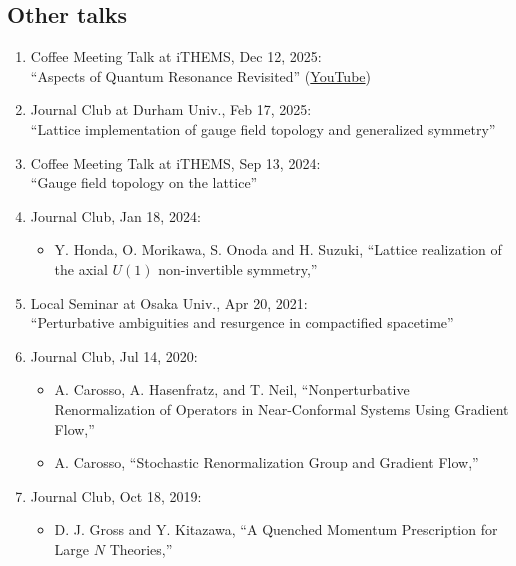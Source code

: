 \subsection{Other talks}
\begin{enumerate}
 \item Coffee Meeting Talk at iTHEMS, Dec 12, 2025:\\
       ``Aspects of Quantum Resonance Revisited''
       (\href{https://www.youtube.com/live/dK8arrieLx8?si=geFnlfco9NnLaEWC}{YouTube})
 \item Journal Club at Durham Univ., Feb 17, 2025:\\
       ``Lattice implementation of gauge field topology and generalized symmetry''
 \item Coffee Meeting Talk at iTHEMS, Sep 13, 2024:\\
       ``Gauge field topology on the lattice''
 \item Journal Club, Jan 18, 2024:
       \begin{itemize}
	\item Y. Honda, O. Morikawa, S. Onoda and H. Suzuki,
	      ``Lattice realization of the axial $U(1)$ non-invertible symmetry,''
       \end{itemize}
 \item Local Seminar at Osaka Univ., Apr 20, 2021:\\
       ``Perturbative ambiguities and resurgence in compactified spacetime''
 \item Journal Club, Jul 14, 2020:
       \begin{itemize}
	\item A. Carosso, A. Hasenfratz, and T. Neil,
	      ``Nonperturbative Renormalization of Operators in Near-Conformal Systems Using Gradient Flow,''
	\item A. Carosso,
	      ``Stochastic Renormalization Group and Gradient Flow,''
       \end{itemize}
 \item Journal Club, Oct 18, 2019:
       \begin{itemize}
	\item  D. J. Gross and Y. Kitazawa,
	       ``A Quenched Momentum Prescription for Large $N$ Theories,''
       \end{itemize}

\end{enumerate}
